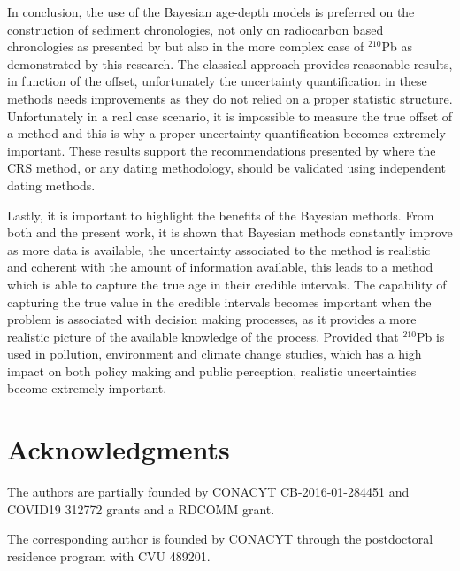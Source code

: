 \documentclass [10pt] {article}
\begin{document}
In conclusion, the use of the Bayesian age-depth models is preferred on the construction of sediment chronologies, not only on radiocarbon based chronologies as presented by \citet{Blaauw2018} but also in the more complex case of $^{210}$Pb as demonstrated by this research.
The classical approach provides reasonable results, in function of the offset, unfortunately the uncertainty quantification in these methods needs improvements as they do not relied on a proper statistic structure. 
Unfortunately in a real case scenario, it is impossible to measure the true offset of a method and this is why a proper uncertainty quantification becomes extremely important.
These results support the recommendations presented by \citet{Smith2001,Barsanti2020} where the CRS method, or any dating methodology, should be validated using independent dating methods. 

Lastly, it is important to highlight the benefits of the Bayesian methods.
From both \citet{Blaauw2018} and the present work, it is shown that Bayesian methods constantly improve as more data is available, the uncertainty associated to the method is realistic and coherent with the amount of information available, this leads to a method which is able to capture the true age in their credible intervals. 
The capability of capturing the true value in the credible intervals becomes important when the problem is associated with decision making processes, as it provides a more realistic picture of the available knowledge of the process. 
Provided that $^{210}$Pb is used in pollution, environment and climate change studies, which has a high impact on both policy making and public perception, realistic uncertainties become extremely important. 



\section{Acknowledgments}

The authors are partially founded by CONACYT CB-2016-01-284451 and COVID19 312772 grants and a RDCOMM grant.

The corresponding author is founded by CONACYT through the postdoctoral residence program with CVU  489201.
\end{document}
